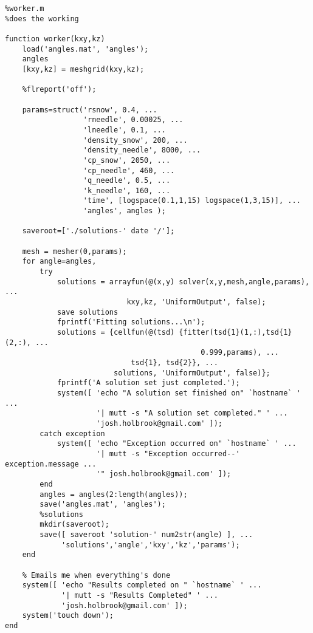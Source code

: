 \small
\begin{verbatim}
%worker.m
%does the working

function worker(kxy,kz)
    load('angles.mat', 'angles');
    angles
    [kxy,kz] = meshgrid(kxy,kz);

    %flreport('off');

    params=struct('rsnow', 0.4, ...
                  'rneedle', 0.00025, ...
                  'lneedle', 0.1, ...
                  'density_snow', 200, ...
                  'density_needle', 8000, ...
                  'cp_snow', 2050, ...
                  'cp_needle', 460, ...
                  'q_needle', 0.5, ...
                  'k_needle', 160, ...
                  'time', [logspace(0.1,1,15) logspace(1,3,15)], ...
                  'angles', angles );

    saveroot=['./solutions-' date '/'];

    mesh = mesher(0,params);
    for angle=angles,
        try
            solutions = arrayfun(@(x,y) solver(x,y,mesh,angle,params), ...
                            kxy,kz, 'UniformOutput', false);
            save solutions
            fprintf('Fitting solutions...\n');
            solutions = {cellfun(@(tsd) {fitter(tsd{1}(1,:),tsd{1}(2,:), ...
                                             0.999,params), ...
                             tsd{1}, tsd{2}}, ...
                         solutions, 'UniformOutput', false)};
            fprintf('A solution set just completed.');
            system([ 'echo "A solution set finished on" `hostname` ' ...
                     '| mutt -s "A solution set completed." ' ...
                     'josh.holbrook@gmail.com' ]);
        catch exception
            system([ 'echo "Exception occurred on" `hostname` ' ...
                     '| mutt -s "Exception occurred--' exception.message ...
                     '" josh.holbrook@gmail.com' ]);
        end
        angles = angles(2:length(angles));
        save('angles.mat', 'angles');
        %solutions
        mkdir(saveroot);
        save([ saveroot 'solution-' num2str(angle) ], ...
             'solutions','angle','kxy','kz','params');
    end

    % Emails me when everything's done
    system([ 'echo "Results completed on " `hostname` ' ...
             '| mutt -s "Results Completed" ' ...
             'josh.holbrook@gmail.com' ]);
    system('touch down');
end
\end{verbatim}
\normalsize

